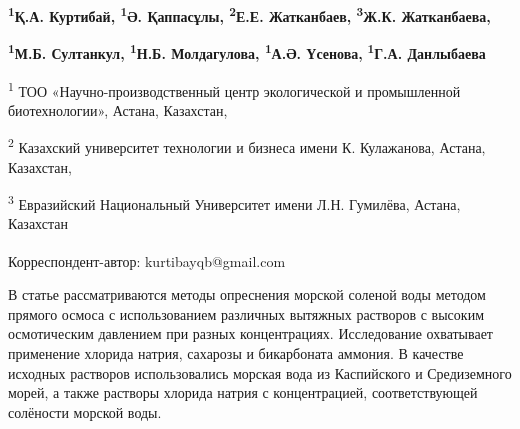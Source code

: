 
\begin{articleheader}

{\bfseries \textsuperscript{1}Қ.А. Куртибай}\textsuperscript{\envelope }{\bfseries ,
\textsuperscript{1}Ә. Қаппасұлы, \textsuperscript{2}Е.Е. Жатканбаев,
\textsuperscript{3}Ж.К. Жатканбаева,}

{\bfseries \textsuperscript{1}М.Б. Султанкул, \textsuperscript{1}Н.Б.
Молдагулова, \textsuperscript{1}А.Ә. Үсенова,}
{\bfseries \textsuperscript{1}Г.А. Данлыбаева}
\end{articleheader}

\begin{affiliation}
\textsuperscript{1} ТОО «Научно-производственный центр экологической и
промышленной биотехнологии», Астана, Казахстан,

\textsuperscript{2} Казахский университет технологии и бизнеса имени К.
Кулажанова, Астана, Казахстан,

\textsuperscript{3} Евразийский Национальный Университет имени Л.Н.
Гумилёва, Астана, Казахстан

\raggedright \textsuperscript{\envelope }Корреспондент-автор: kurtibayqb@gmail.com
\end{affiliation}

В статье рассматриваются методы опреснения морской соленой воды методом
прямого осмоса с использованием различных вытяжных растворов с высоким
осмотическим давлением при разных концентрациях. Исследование охватывает
применение хлорида натрия, сахарозы и бикарбоната аммония. В качестве
исходных растворов использовались морская вода из Каспийского и
Средиземного морей, а также растворы хлорида натрия с концентрацией,
соответствующей солёности морской воды.


